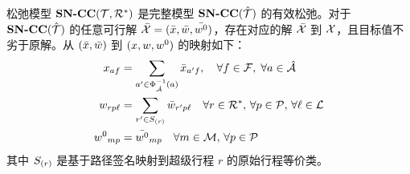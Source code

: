 \begin{theorem}
\label{pro.valid_relaxation}
    松弛模型 $\textbf{SN-CC}({\mathcal{T}, \mathcal{R}^{*}})$ 是完整模型 $\textbf{SN-CC}({\hat{\mathcal{T}}})$ 的有效松弛。对于 $\textbf{SN-CC}({\hat{\mathcal{T}}})$ 的任意可行解 $\bar{\mathcal{X}}=(\bar{x}, \bar{w}, \bar{{w^0}})$，存在对应的解 $\bar{\mathcal{X}}$ 到 $\mathcal{X}$，且目标值不劣于原解。从 $(\bar{x},\bar{w})$ 到 $(x, w, {w^0})$ 的映射如下：
    \begin{equation}
    \begin{aligned}
        x_{af} &= \sum_{a^\prime\in\Phi_{\hat{\mathcal{A}}}^{-1}(a)} \bar{x}_{a^\prime f},
        \quad \forall f\in \mathcal{F},\; \forall a\in \hat{\mathcal{A}}\\
        w_{rp\ell} &= \sum_{r' \in S_{(r)}} \bar{w}_{r'p\ell} \quad \forall r \in \mathcal{R}^{*},\, \forall p \in \mathcal{P},\, \forall \ell \in \mathcal{L}\\
        {w^0}_{mp} &= \bar{{w^0}}_{mp} \quad \forall m \in \mathcal{M},\, \forall p \in \mathcal{P}
    \end{aligned}
    \label{eq:map_ori2rel}
    \end{equation}
其中 $S_{(r)}$ 是基于路径签名映射到超级行程 $r$ 的原始行程等价类。
\end{theorem}
